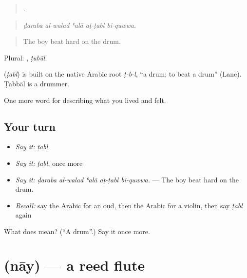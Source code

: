 \begin{quote}
    .
\end{quote}

\begin{quote}
\emph{ḍaraba al-walad ʿalā aṭ-ṭabl bi-quwwa.}
\end{quote}

\begin{quote}
The boy beat hard on the drum.
\end{quote}

Plural: , \emph{ṭubūl}.

\begin{cousinweb}
\textbf{} (\emph{ṭabl}) is built on the native Arabic root \emph{ṭ-b-l}, \textquotedblleft{}a drum; to beat a drum\textquotedblright{} (Lane). Ṭabbāl is a drummer.
\end{cousinweb}

\begin{grammarlens}[title={What you've built}]
One more word for describing what you lived and felt.
\end{grammarlens}

\subsection*{Your turn}
\begin{itemize}
\raggedright
  \item \emph{Say it:} \emph{ṭabl}
  \item \emph{Say it:} \emph{ṭabl}, once more
  \item \emph{Say it:} \emph{ḍaraba al-walad ʿalā aṭ-ṭabl bi-quwwa.} — The boy beat hard on the drum.
  \item \emph{Recall:} say the Arabic for an oud, then the Arabic for a violin, then say \emph{ṭabl} again
\end{itemize}

\begin{tcolorbox}[breakable,colback=teal!4,colframe=teal!35!black,title={Before you move on}]
What does  mean? (\textquotedblleft{}A drum\textquotedblright{}.) Say it once more.
\end{tcolorbox}
\section[\texorpdfstring{\ar{ناي} (nāy)}{ناي (nāy)}]{ (nāy) — a reed flute}

\label{lesson:AR-C544-nay}



